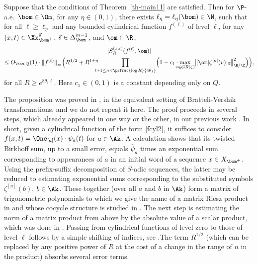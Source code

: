 \begin{prop} \label{prop-Dioph4} Suppose that the conditions of Theorem~\ref{th-main11} are satisfied. Then
for $\P$-a.e.\ $\bom\in \Om$,
for any $\eta\in (0,1)$, there exists $\ell_\eta=\ell_\eta(\bom)\in \N$, such that
for all $\ell\ge \ell_\eta$ and any bounded cylindrical function $f^{(\ell)}$ of level $\ell$,
for any $(x,t)\in \Xx_{\bom^+}^{\vec{s}}$, $\vec s\in \Delta_\bom^{m-1}$, and $\om\in \R$,
\begin{multline}
\label{eq-Dioph3}
|S^{(x,t)}_R(f^{(\ell)},\om)|\\
\le O_{\bom,Q}(1)\cdot \|f^{(\ell)}\|_{_\infty} \Bigl(R^{1/2}+ R^{1+\eta}\!\!\!\!\!\prod_{\ell+1\le n < \psfrac{\log R}{4\theta_1}}
\Bigl( 1 - c_1\cdot \!\!\!\! \max_{v\in GR(\zeta)}\bigl\| \om|\zeta^{[n]}(v)|_{\vec{s}}\bigr\|^2_{\R/\Z}\Bigr)\Bigr),
\end{multline}
for all
$
R\ge e^{8\theta_1 \ell}.
$
Here $c_1\in (0,1)$ is a constant depending only on $Q$.
\end{prop}

The proposition was proved in \cite[Prop.\,7.1]{BuSo18a}, in the equivalent setting of Bratteli-Vershik transformations, and we do not repeat it here. The proof proceeds in several steps, which already appeared in one way or the other, in our previous work \cite{BuSol2,BuSo18a,BuSo19}.
In short, given a cylindrical function of the form \eqref{fcyl2}, it suffices to consider $f(x,t)=\One_{[a]}(x) \cdot \psi_a(t)$ for $a\in \Ak$. A calculation shows that its twisted Birkhoff sum, up to a small error, equals $\widehat{\psi}_a$ times an exponential sum corresponding to appearances of $a$ in an initial word of a sequence $x\in X_{\bom^+}$. Using the prefix-suffix decomposition of $S$-adic sequences, the latter may be reduced to estimating exponential sums corresponding to the substituted symbols $\zeta^{[n]}(b)$, $b\in \Ak$. These together (over all $a$ and $b$ in $\Ak$) form a matrix of trigonometric polynomials to which we give the name of a matrix Riesz product in
\cite[\S3.2]{BuSo18a} and whose cocycle structure is studied in \cite{BuSo19}. The next step is estimating the norm of a matrix product from above by the absolute value of a scalar product, which was done in \cite[Prop.\,3.4]{BuSo18a}. Passing from cylindrical functions of level zero to those of level $\ell$ follows by a simple shifting of indices, see \cite[\S3.5]{BuSo18a}.The term $R^{1/2}$ (which can be replaced by any positive power of $R$ at the cost of a change in the range of $n$ in the product) absorbs several error terms.

